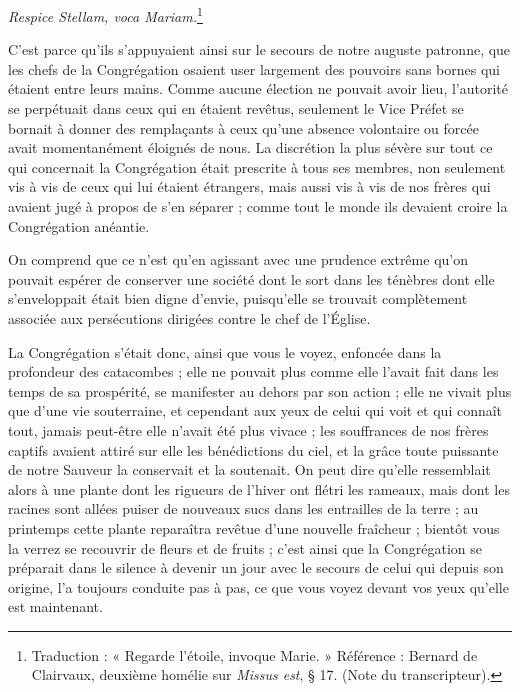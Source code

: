 \textit{Respice Stellam, voca Mariam.}\footnote{Traduction : « Regarde l’étoile, invoque Marie. » Référence : Bernard de Clairvaux, deuxième homélie sur \textit{Missus est}, § 17. (Note du transcripteur).}

C'est parce qu'ils s'appuyaient ainsi sur le secours de notre auguste patronne, que les chefs de la Congrégation osaient user largement des pouvoirs sans bornes qui étaient entre leurs mains. Comme aucune élection ne pouvait avoir lieu, l'autorité se perpétuait dans ceux qui en étaient revêtus, seulement le
Vice Préfet se bornait à donner des remplaçants à ceux qu'une absence volontaire ou forcée avait momentanément éloignés de nous. La discrétion la plus sévère sur tout ce qui concernait la Congrégation était prescrite à tous ses membres, non seulement vis à vis de ceux qui lui étaient étrangers, mais aussi vis à vis de nos frères qui avaient jugé à propos de s'en séparer ; comme tout le monde ils devaient croire la Congrégation anéantie.

On comprend que ce n'est qu'en agissant avec une prudence extrême qu'on pouvait espérer de conserver une société dont le sort dans les ténèbres dont elle s'enveloppait était bien digne d'envie, puisqu'elle se trouvait complètement associée aux persécutions dirigées contre le chef de l'Église.

La Congrégation s'était donc, ainsi que vous le voyez, enfoncée dans la profondeur des catacombes ; elle ne pouvait plus comme elle l'avait fait dans les temps de sa prospérité, se manifester au dehors par son action ; elle ne vivait plus que d'une vie souterraine, et cependant aux yeux de celui qui voit et qui connaît tout, jamais peut-être elle n'avait été plus vivace ; les souffrances de nos frères captifs avaient attiré sur elle les bénédictions du ciel, et la grâce toute puissante de notre Sauveur la conservait et la soutenait. On peut dire qu'elle ressemblait alors à une plante dont les rigueurs de l'hiver ont flétri les rameaux, mais dont les racines sont allées puiser de nouveaux sucs dans les entrailles de la terre ; au printemps cette plante reparaîtra revêtue d'une nouvelle fraîcheur ; bientôt vous la verrez se recouvrir de fleurs et de fruits ; c'est ainsi que la Congrégation se préparait dans le silence à devenir un jour avec le secours de celui qui depuis son origine, l'a toujours conduite pas à pas, ce que vous voyez devant vos yeux qu'elle est maintenant.

